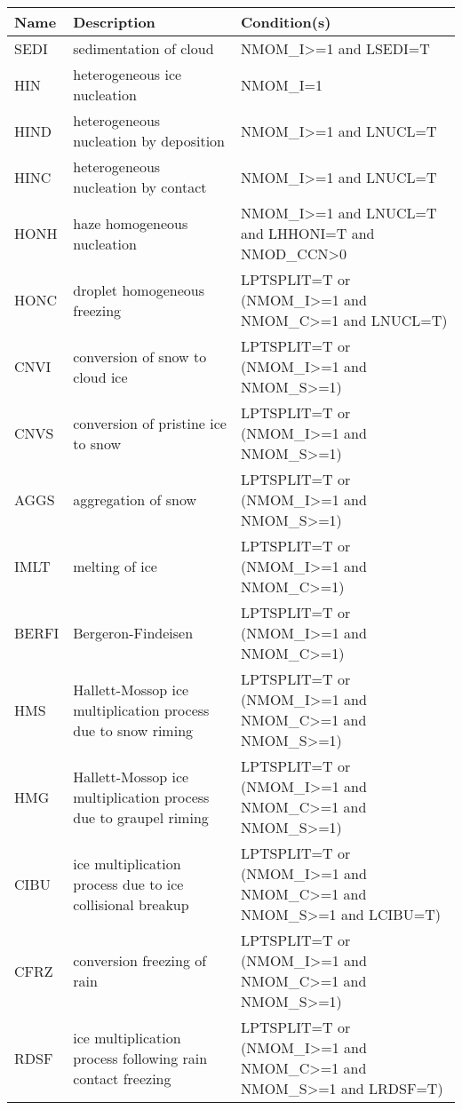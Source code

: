 \begin{longtable} {|p{}|p{}|p{}|}
\hline
Name & Description & Condition(s) \\
\hline \hline
\endhead
SEDI   & sedimentation of cloud                         & NMOM\_I>=1 and LSEDI=T \\\hline
HIN    & heterogeneous ice nucleation                   & NMOM\_I=1 \\\hline
HIND   & heterogeneous nucleation by deposition         & NMOM\_I>=1 and LNUCL=T \\\hline
HINC   & heterogeneous nucleation by contact            & NMOM\_I>=1 and LNUCL=T \\\hline
HONH   & haze homogeneous nucleation                    & NMOM\_I>=1 and LNUCL=T and LHHONI=T and NMOD\_CCN>0 \\\hline
HONC   & droplet homogeneous freezing                   & LPTSPLIT=T or (NMOM\_I>=1 and NMOM\_C>=1 and LNUCL=T) \\\hline
CNVI   & conversion of snow to cloud ice                & LPTSPLIT=T or (NMOM\_I>=1 and NMOM\_S>=1) \\\hline
CNVS   & conversion of pristine ice to snow             & LPTSPLIT=T or (NMOM\_I>=1 and NMOM\_S>=1) \\\hline
AGGS   & aggregation of snow                            & LPTSPLIT=T or (NMOM\_I>=1 and NMOM\_S>=1) \\\hline
IMLT   & melting of ice                                 & LPTSPLIT=T or (NMOM\_I>=1 and NMOM\_C>=1) \\\hline
BERFI  & Bergeron-Findeisen                             & LPTSPLIT=T or (NMOM\_I>=1 and NMOM\_C>=1) \\\hline
HMS    & Hallett-Mossop ice multiplication process due to snow riming    & LPTSPLIT=T or (NMOM\_I>=1 and NMOM\_C>=1 and NMOM\_S>=1) \\\hline
HMG    & Hallett-Mossop ice multiplication process due to graupel riming & LPTSPLIT=T or (NMOM\_I>=1 and NMOM\_C>=1 and NMOM\_S>=1) \\\hline
CIBU   & ice multiplication process due to ice collisional breakup & LPTSPLIT=T or (NMOM\_I>=1 and NMOM\_C>=1 and NMOM\_S>=1 and LCIBU=T) \\\hline
CFRZ   & conversion freezing of rain                    & LPTSPLIT=T or (NMOM\_I>=1 and NMOM\_C>=1 and NMOM\_S>=1) \\\hline
RDSF   & ice multiplication process following rain contact freezing & LPTSPLIT=T or (NMOM\_I>=1 and NMOM\_C>=1 and NMOM\_S>=1 and LRDSF=T) \\\hline

\end{longtable}
